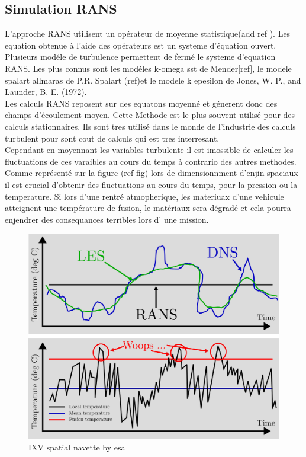 \subsection{Simulation RANS}

L'approche RANS utilisent un opérateur de moyenne statistique(add ref ). Les equation obtenue à l'aide des opérateurs est un systeme d'équation ouvert. Plusieurs modéle de turbulence permettent de fermé le systeme d'equation RANS. Les plus connus sont les modéles k-omega sst de Mender[ref], le modele spalart allmaras de P.R. Spalart (ref)et le modele k epesilon de Jones, W. P., and Launder, B. E. (1972).\\
Les calculs RANS reposent sur des equatons moyenné et génerent donc des champs d'écoulement moyen. Cette Methode est le plus souvent utilisé pour des calculs stationnaires. Ils sont tres utilisé dans le monde de l'industrie des calculs turbulent pour sont cout de calculs qui est tres interresant.\\
Cependant en moyennant les variables turbulente il est imossible de calculer les fluctuations de ces varaibles au cours du temps à contrario des autres methodes. Comme représenté sur la figure (ref fig) lors de dimensionnment d'enjin spaciaux il est crucial d'obtenir des fluctuations au cours du temps, pour la pression ou la temperature. Si lors d'une rentré atmopherique, les materiuax d'une vehicule atteignent une température de fusion, le matériaux sera dégradé et cela pourra enjendrer des consequances terribles lors d' une mission.

\begin{figure}[h!]
 \centering
 \includegraphics[width=0.7\linewidth]{chapter1_introduction/pictures/les_rans_dns.png}
 \vspace{-2ex}
 \caption{IXV spatial navette by esa}
  \vspace{2ex}
 \label{rans}
\end{figure}
